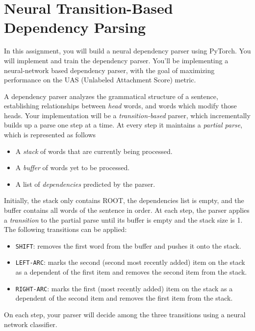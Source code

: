 \section{Neural Transition-Based Dependency Parsing}
In this assignment, you will build a neural dependency parser using PyTorch. You will implement and train the dependency parser.
You'll be implementing a neural-network based dependency parser, with the goal of maximizing performance on the UAS (Unlabeled Attachment Score) metric.\newline

A dependency parser analyzes the grammatical structure of a sentence, establishing relationships between \textit{head} words, and words which modify those heads. Your implementation will be a {\it transition-based} parser, which incrementally builds up a parse one step at a time. At every step it maintains a \textit{partial parse}, which is represented as follows
\begin{itemize}
    \item A \textit{stack} of words that are currently being processed.
    \item A \textit{buffer} of words yet to be processed.
    \item A list of \textit{dependencies} predicted by the parser.
\end{itemize}
Initially, the stack only contains ROOT, the dependencies list is empty, and the buffer contains all words of the sentence in order. At each step, the parser applies a \textit{transition} to the partial parse until its buffer is empty and the stack size is 1. The following transitions can be applied:
\begin{itemize}
\item \texttt{SHIFT}: removes the first word from the buffer and pushes it onto the stack.
\item \texttt{LEFT-ARC}: marks the second (second most recently added) item on the stack as a dependent of the first item and removes the second item from the stack.
\item \texttt{RIGHT-ARC}: marks the first (most recently added) item on the stack as a dependent of the second item and removes the first item from the stack.
\end{itemize}
On each step, your parser will decide among the three transitions using a neural network classifier.

